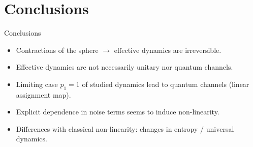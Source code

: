 \section{Conclusions}

\begin{frame}{Conclusions}
    \begin{itemize}
        \item Contractions of the sphere $\rightarrow$ effective dynamics are irreversible.
        \item Effective dynamics are not necessarily unitary nor quantum channels.
        \item Limiting case $p_{1}=1$ of studied dynamics lead to quantum channels (linear assignment map).
        \item Explicit dependence in noise terms seems to induce non-linearity.
        \item Differences with classical non-linearity: changes in entropy / universal dynamics.
    \end{itemize}
\end{frame}